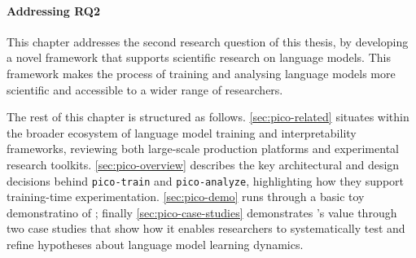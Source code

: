 \paragraph{Addressing RQ2} This chapter addresses the second research question of this thesis, by developing a novel framework that supports scientific research on language models. This framework makes the process of training and analysing language models more scientific and accessible to a wider range of researchers.

\vspace{1em}

The rest of this chapter is structured as follows. \cref{sec:pico-related} situates \pico within the broader ecosystem of language model training and interpretability frameworks, reviewing both large-scale production platforms and experimental research toolkits. \cref{sec:pico-overview} describes the key architectural and design decisions behind \texttt{pico-train} and \texttt{pico-analyze}, highlighting how they support training-time experimentation. \cref{sec:pico-demo} runs through a basic toy demonstratino of \pico; finally \cref{sec:pico-case-studies} demonstrates \pico's value through two case studies that show how it enables researchers to systematically test and refine hypotheses about language model learning dynamics.

